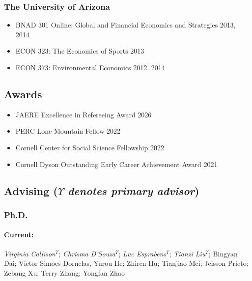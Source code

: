 \documentclass[11pt]{res} %
\begin{document}
\begin{resume}
\subsubsection{The University of Arizona}
\begin{itemize} \itemsep -1pt %
	\item[] BNAD 301 Online: Global and Financial Economics and Strategies \hfill 2013, 2014
	\item[] ECON 323: The Economics of Sports \hfill 2013
	\item[] ECON 373: Environmental Economics \hfill 2012, 2014
\end{itemize}

\vspace{-.2in}

\subsection{Awards}
\begin{itemize} \itemsep -1pt
	\item[] JAERE Excellence in Refereeing Award \hfill 2026
	\item[] PERC Lone Mountain Fellow \hfill 2022
	\item[] Cornell Center for Social Science Fellowship \hfill 2022
	\item[] Cornell Dyson Outstanding Early Career Achievement Award \hfill 2021
\end{itemize}

\vspace{-.2in}

\subsection{Advising ($\Upsilon$ \textit{denotes primary advisor})  }
\vspace{-.2in}
 
\subsubsection{Ph.D.}\vspace{-.2in}
\paragraph{Current:} \textit{Virginia Callison}$^\Upsilon$; \textit{Chrisma D'Souza}$^\Upsilon$; \textit{Luc Esprabens}$^\Upsilon$; \textit{Tianzi Liu}$^\Upsilon$; Bingyan Dai; Victor Simoes Dornelas, Yurou He; Zhiren Hu; Tianjiao Mei; Jeisson Prieto; Zebang Xu; Terry Zhang; Yongfan Zhao
\vspace{-.35in}

\end{resume}
\end{document}
